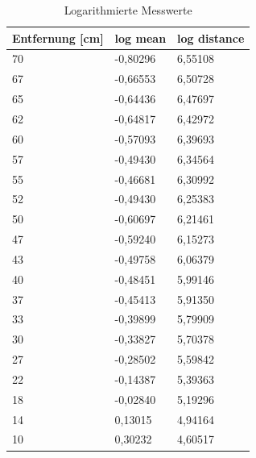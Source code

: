 \documentclass[12pt, oneside, a4paper, \docLanguage]{report}
\begin{document}
\begin{table}[ht!]
\centering
\begin{tabular}{|l|l|l|}
\hline
\textbf{Entfernung {[}cm{]}} & \textbf{log mean} & \textbf{log distance} \\ \hline
70                           & -0,80296              & 6,55108           \\ \hline
67                           & -0,66553              & 6,50728           \\ \hline
65                           & -0,64436              & 6,47697           \\ \hline
62                           & -0,64817              & 6,42972           \\ \hline
60                           & -0,57093              & 6,39693           \\ \hline
57                           & -0,49430              & 6,34564           \\ \hline
55                           & -0,46681              & 6,30992           \\ \hline
52                           & -0,49430              & 6,25383           \\ \hline
50                           & -0,60697              & 6,21461           \\ \hline
47                           & -0,59240              & 6,15273           \\ \hline
43                           & -0,49758              & 6,06379           \\ \hline
40                           & -0,48451              & 5,99146           \\ \hline
37                           & -0,45413              & 5,91350           \\ \hline
33                           & -0,39899              & 5,79909           \\ \hline
30                           & -0,33827              & 5,70378           \\ \hline
27                           & -0,28502              & 5,59842           \\ \hline
22                           & -0,14387              & 5,39363           \\ \hline
18                           & -0,02840              & 5,19296           \\ \hline
14                           & 0,13015               & 4,94164           \\ \hline
10                           & 0,30232               & 4,60517           \\ \hline
\end{tabular}
\caption{Logarithmierte Messwerte}
\label{fig:VERSUCH_2_MESSWERTE_TABELLE}
\end{table}
\newpage
\end{document}
